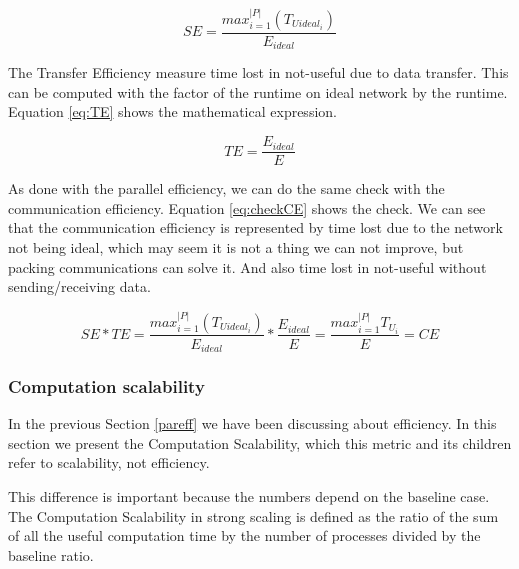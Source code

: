     \begin{equation}\label{eq:SE}
      SE=\frac{max_{i=1}^{|P|}( T_{Uideal_{i}})}{E_{ideal}}
    \end{equation}

    The Transfer Efficiency measure time lost in not-useful due to data transfer. This can be computed with the factor of the runtime on ideal network by the runtime. Equation \ref{eq:TE} shows the mathematical expression.

    \begin{equation}\label{eq:TE}
      TE=\frac{E_{ideal}}{E}
    \end{equation}
    
    As done with the parallel efficiency, we can do the same check with the communication efficiency. Equation \ref{eq:checkCE} shows the check. We can see that the communication efficiency is represented by time lost due to the network not being ideal, which may seem it is not a thing we can not improve, but packing communications can solve it. And also time lost in not-useful without sending/receiving data.

    \begin{equation}\label{eq:checkCE}
      SE\ast TE=\frac{max_{i=1}^{|P|}( T_{Uideal_{i}})}{E_{ideal}} \ast \frac{E_{ideal}}{E} = \frac{max^{|P|}_{i=1} T_{U_i}}{E} = CE
    \end{equation}

\subsubsection{Computation scalability}

In the previous Section \ref{pareff} we have been discussing about efficiency. In this section we present the Computation Scalability, which this metric and its children refer to scalability, not efficiency.

This difference is important because the numbers depend on the baseline case. The Computation Scalability in strong scaling is defined as the ratio of the sum of all the useful computation time by the number of processes divided by the baseline ratio.

